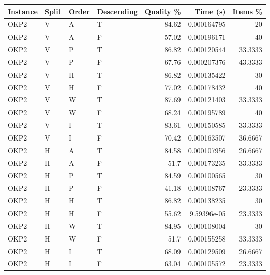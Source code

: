 \begin{tabular}{llllrrr}
    \hline
    Instance & Split & Order & Descending & Quality \% & Time (s)    & Items \% \\
    \hline
    OKP2     & V     & A     & T          & 84.62      & 0.000164795 & 20       \\
    OKP2     & V     & A     & F          & 57.02      & 0.000196171 & 40       \\
    OKP2     & V     & P     & T          & 86.82      & 0.000120544 & 33.3333  \\
    OKP2     & V     & P     & F          & 67.76      & 0.000207376 & 43.3333  \\
    OKP2     & V     & H     & T          & 86.82      & 0.000135422 & 30       \\
    OKP2     & V     & H     & F          & 77.02      & 0.000178432 & 40       \\
    OKP2     & V     & W     & T          & 87.69      & 0.000121403 & 33.3333  \\
    OKP2     & V     & W     & F          & 68.24      & 0.000195789 & 40       \\
    OKP2     & V     & I     & T          & 83.61      & 0.000150585 & 33.3333  \\
    OKP2     & V     & I     & F          & 70.42      & 0.000163507 & 36.6667  \\
    OKP2     & H     & A     & T          & 84.58      & 0.000107956 & 26.6667  \\
    OKP2     & H     & A     & F          & 51.7       & 0.000173235 & 33.3333  \\
    OKP2     & H     & P     & T          & 84.59      & 0.000100565 & 30       \\
    OKP2     & H     & P     & F          & 41.18      & 0.000108767 & 23.3333  \\
    OKP2     & H     & H     & T          & 86.82      & 0.000138235 & 30       \\
    OKP2     & H     & H     & F          & 55.62      & 9.59396e-05 & 23.3333  \\
    OKP2     & H     & W     & T          & 84.95      & 0.000108004 & 30       \\
    OKP2     & H     & W     & F          & 51.7       & 0.000155258 & 33.3333  \\
    OKP2     & H     & I     & T          & 68.09      & 0.000129509 & 26.6667  \\
    OKP2     & H     & I     & F          & 63.04      & 0.000105572 & 23.3333  \\

\end{tabular}
